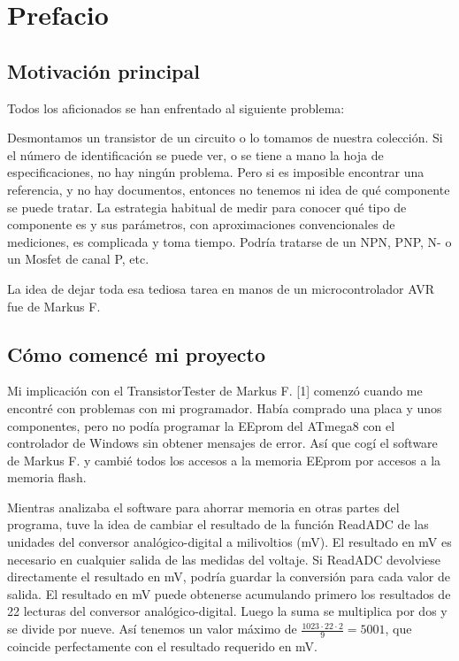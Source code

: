 \section*{Prefacio}
\subsection*{Motivación principal}
Todos los aficionados se han enfrentado al siguiente problema: 

Desmontamos un transistor de un circuito o lo tomamos de nuestra colección. Si el número de identificación se puede ver, o se tiene a mano la hoja de especificaciones, no hay ningún problema. Pero si es imposible encontrar una referencia, y no hay documentos, entonces no tenemos ni idea de qué componente se puede tratar. La estrategia habitual de medir para conocer qué tipo de componente es y sus parámetros, con aproximaciones convencionales de mediciones, es complicada y toma tiempo. Podría tratarse de un NPN, PNP, N- o un Mosfet de canal P, etc. 

La idea de dejar toda esa tediosa tarea en manos de un microcontrolador AVR fue de Markus F.

\subsection*{Cómo comencé mi proyecto}

Mi implicación con el TransistorTester de Markus F. [1] comenzó cuando me encontré con problemas con mi programador. Había comprado una placa y unos componentes, pero no podía programar la EEprom del ATmega8 con el controlador de Windows sin obtener mensajes de error. Así que cogí el software de Markus F. y cambié todos los accesos a la memoria EEprom por accesos a la memoria flash. 

Mientras analizaba el software para ahorrar memoria en otras partes del programa, tuve la idea de cambiar el resultado de la función ReadADC de las unidades del conversor analógico-digital a milivoltios (mV). El resultado en mV es necesario en cualquier salida de las medidas del voltaje. Si ReadADC devolviese directamente el resultado en mV, podría guardar la conversión para cada valor de salida. El resultado en mV puede obtenerse acumulando primero los resultados de 22 lecturas del conversor analógico-digital. Luego la suma se multiplica por dos y se divide por nueve. Así tenemos un valor máximo de $\frac{1023·22·2}{9} = 5001$, que coincide perfectamente con el resultado requerido en mV. 

